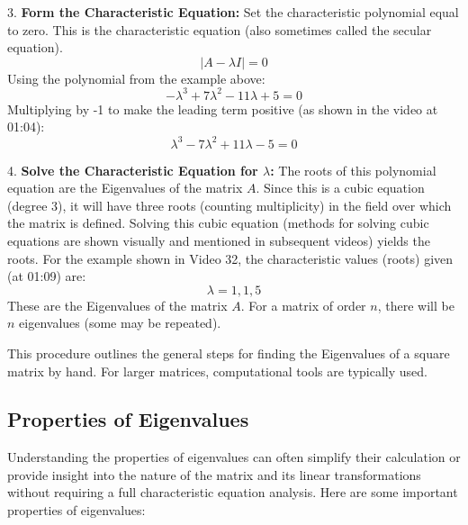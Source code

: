 \documentclass{article}
\begin{document}
3.  \textbf{Form the Characteristic Equation:} Set the characteristic polynomial equal to zero. This is the characteristic equation (also sometimes called the secular equation).
    \[ |A - \lambda I| = 0 \]
    Using the polynomial from the example above:
    \[ -\lambda^3 + 7\lambda^2 - 11\lambda + 5 = 0 \]
    Multiplying by -1 to make the leading term positive (as shown in the video at 01:04):
    \[ \lambda^3 - 7\lambda^2 + 11\lambda - 5 = 0 \]

4.  \textbf{Solve the Characteristic Equation for $\lambda$:} The roots of this polynomial equation are the Eigenvalues of the matrix $A$. Since this is a cubic equation (degree 3), it will have three roots (counting multiplicity) in the field over which the matrix is defined.
    Solving this cubic equation (methods for solving cubic equations are shown visually and mentioned in subsequent videos) yields the roots. For the example shown in Video 32, the characteristic values (roots) given (at 01:09) are:
    \[ \lambda = 1, 1, 5 \]
    These are the Eigenvalues of the matrix $A$. For a matrix of order $n$, there will be $n$ eigenvalues (some may be repeated).

This procedure outlines the general steps for finding the Eigenvalues of a square matrix by hand. For larger matrices, computational tools are typically used.



\subsection{Properties of Eigenvalues} %

Understanding the properties of eigenvalues can often simplify their calculation or provide insight into the nature of the matrix and its linear transformations without requiring a full characteristic equation analysis. Here are some important properties of eigenvalues:
\end{document}
